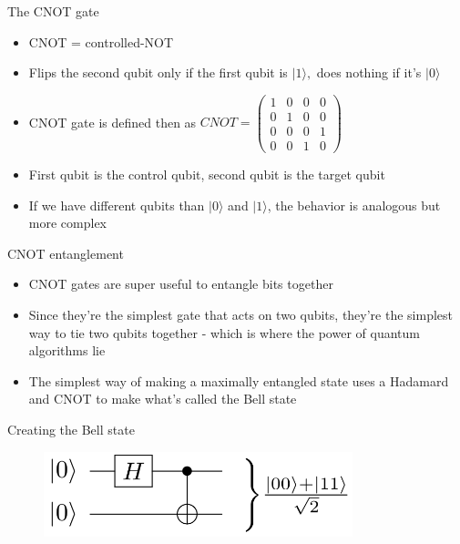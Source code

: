 \documentclass[aspectratio=169, handout]{beamer}
\begin{document}
\begin{frame}{The CNOT gate}
    \begin{itemize}
        \item CNOT = controlled-NOT \pause
        \item Flips the second qubit only if the first qubit is $|1\rangle,$ does nothing if it's $|0\rangle$ \pause
        \item CNOT gate is defined then as $CNOT = \begin{pmatrix}
        1 & 0 & 0 & 0 \\
        0 & 1 & 0 & 0 \\
        0 & 0 & 0 & 1 \\
        0 & 0 & 1 & 0
    \end{pmatrix}$
        \item First qubit is the control qubit, second qubit is the target qubit \pause
        \item If we have different qubits than $|0\rangle$ and $|1\rangle$, the behavior is analogous but more complex
    \end{itemize}
\end{frame}

\begin{frame}{CNOT entanglement}
    \begin{itemize}
        \item CNOT gates are super useful to entangle bits together \pause
        \item Since they're the simplest gate that acts on two qubits, they're the simplest way to tie two qubits together - which is where the power of quantum algorithms lie \pause
        \item The simplest way of making a maximally entangled state uses a Hadamard and CNOT to make what's called the \textcolor{sigma@mainblue}{Bell state}
    \end{itemize}
\end{frame}

\begin{frame}{Creating the Bell state}
  \begin{figure}
      \centering
      \includegraphics[width=0.8\textwidth]{bellstate.png}
  \end{figure}
\end{frame}
\end{document}
